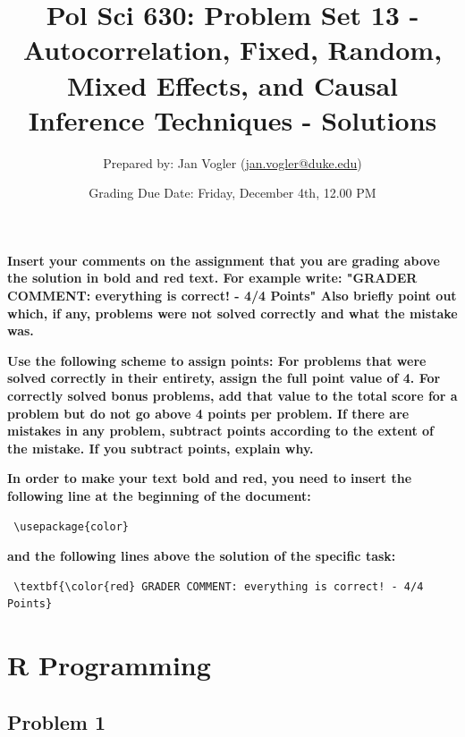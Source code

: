 \documentclass[12pt]{article}\usepackage[]{graphicx}\usepackage[]{color}
\begin{document}
\title{Pol Sci 630: Problem Set 13 - Autocorrelation, Fixed, Random, Mixed Effects, and Causal Inference Techniques - Solutions}

\author{Prepared by: Jan Vogler (\href{mailto:jan.vogler@duke.edu}{jan.vogler@duke.edu})}

\date{Grading Due Date: Friday, December 4th, 12.00 PM}
 
\maketitle



\textbf{\color{red} Insert your comments on the assignment that you are grading above the solution in bold and red text. For example write: "GRADER COMMENT: everything is correct! - 4/4 Points" Also briefly point out which, if any, problems were not solved correctly and what the mistake was.}

\bigskip

\textbf{Use the following scheme to assign points: For problems that were solved correctly in their entirety, assign the full point value of 4. For correctly solved bonus problems, add that value to the total score for a problem but do not go above 4 points per problem. If there are mistakes in any problem, subtract points according to the extent of the mistake. If you subtract points, explain why.}

\bigskip

\textbf{In order to make your text bold and red, you need to insert the following line at the beginning of the document:}

\begin{verbatim} \usepackage{color} \end{verbatim}

\textbf{and the following lines above the solution of the specific task:}

\begin{verbatim} \textbf{\color{red} GRADER COMMENT: everything is correct! - 4/4 Points} \end{verbatim}



\pagebreak

\section*{R Programming}

\subsection*{Problem 1}
\end{document}
